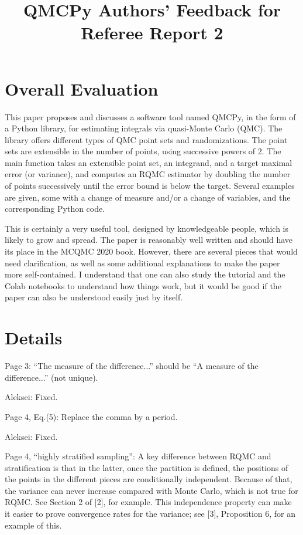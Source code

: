 \documentclass{amsart}
\begin{document}
\title{QMCPy Authors' Feedback for Referee Report 2}

\newcommand{\AGSComment}[1]{{\color{cyan} Aleksei: #1}}

\maketitle


\section{Overall Evaluation}

This paper proposes and discusses a software tool named QMCPy, in the form of a Python library, for estimating integrals via quasi-Monte Carlo (QMC). The library offers different types of QMC point sets and randomizations. The point sets are extensible in the number of points, using successive powers of 2. The main function takes an extensible point set, an integrand, and a target maximal error (or variance), and computes an RQMC estimator by doubling the number of points successively until the error bound is below the target. Several examples are given, some with a change of measure and/or a change of variables, and the corresponding Python code.

This is certainly a very useful tool, designed by knowledgeable people, which is likely to grow and spread. The paper is reasonably well written and should have its place in the MCQMC 2020 book. However, there are several pieces that would need clarification, as well as some additional explanations to make the paper more self-contained. I understand that one can also study the tutorial and the Colab notebooks to understand how things work, but it would be good if the paper can also be understood easily just by itself.

\section{Details}

Page 3: ``The measure of the difference...'' should be ``A measure of the difference...'' (not
unique).

\AGSComment{Fixed.}
\vspace{1cm}

Page 4, Eq.(5): Replace the comma by a period.

\AGSComment{Fixed.}
\vspace{1cm}

Page 4, ``highly stratified sampling'': A key difference between RQMC and stratification is that in the latter, once the partition is defined, the positions of the points in the different pieces are conditionally independent. Because of that, the variance can never increase compared with Monte Carlo, which is not true for RQMC. See Section 2 of [2], for example. This independence property can make it easier to prove convergence rates for the variance; see
[3], Proposition 6, for an example of this. \vspace{1cm}
\end{document}
